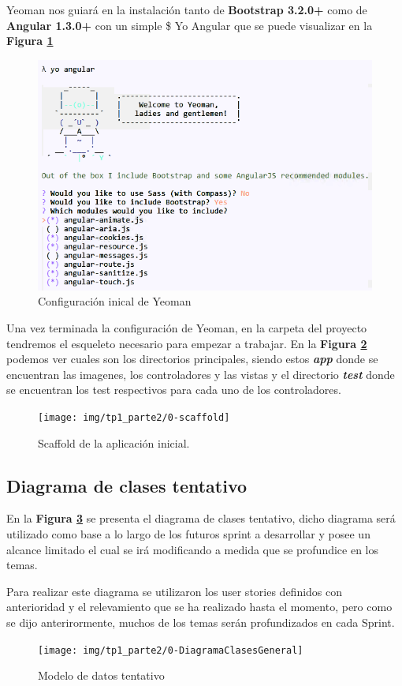 Yeoman nos guiará en la instalación tanto de \textbf{Bootstrap 3.2.0+} como de  \textbf{Angular 1.3.0+} con un simple \$ Yo Angular que se puede visualizar en  la \textbf{Figura \ref{yeomanInstall}}

\begin{figure}[h]
  \centering
  \includegraphics[width=1\textwidth]{img/tp1_parte2/0-instalacionConYeoman}
  \caption{Configuración inical de Yeoman}
  \label{yeomanInstall}
\end{figure}

Una vez terminada la configuración de Yeoman, en la carpeta del proyecto tendremos el esqueleto necesario para empezar a trabajar. En la  \textbf{Figura \ref{scaffold}} podemos ver cuales son los directorios principales, siendo estos \textbf{\textit{app}} donde se encuentran las imagenes, los controladores y las vistas y el directorio \textbf{\textit{test}} donde se encuentran los test respectivos para cada uno de los controladores.

\begin{figure}[h]
  \centering
  \texttt{[image: img/tp1\_parte2/0-scaffold]}
  \caption{Scaffold de la aplicación inicial.}
  \label{scaffold}
\end{figure}

\subsection{Diagrama de clases tentativo}
En la \textbf{Figura \ref{2-modelo_datos_general}} se presenta el diagrama de clases tentativo, dicho diagrama  será utilizado como base a lo largo de los futuros sprint a desarrollar y posee un alcance limitado el cual se irá modificando a medida que se profundice en los temas.

Para realizar este diagrama se utilizaron los user stories definidos con anterioridad y el relevamiento que se ha realizado hasta el momento, pero como se dijo anterirormente, muchos de los temas serán profundizados en cada Sprint.

\begin{figure}
  \centering
  \texttt{[image: img/tp1\_parte2/0-DiagramaClasesGeneral]}
  \caption{Modelo de datos tentativo}
  \label{2-modelo_datos_general}
\end{figure}


\clearpage %